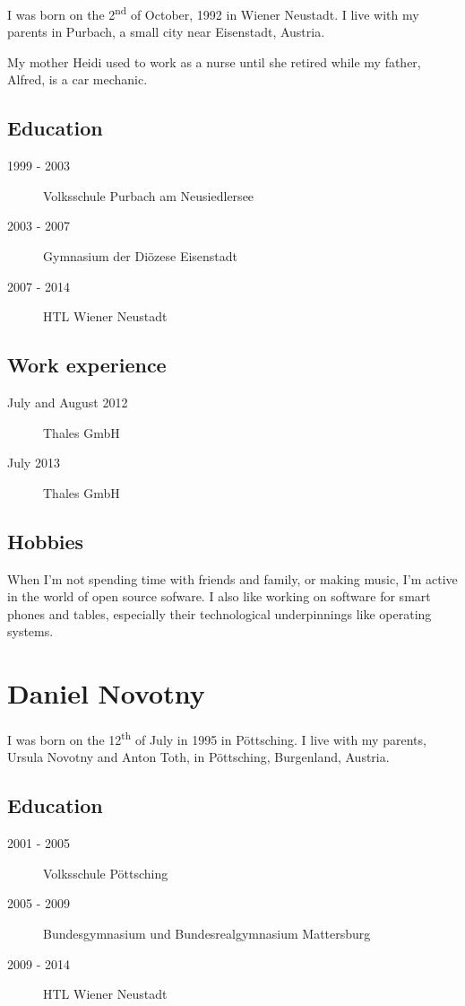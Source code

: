 I was born on the 2\textsuperscript{nd} of October, 1992 in Wiener Neustadt. I live with my parents in Purbach, a small city near Eisenstadt, Austria.

My mother Heidi used to work as a nurse until she retired while my father, Alfred, is a car mechanic.

\subsection{Education}
\begin{description}
\item[1999 - 2003] Volksschule Purbach am Neusiedlersee
\item[2003 - 2007] Gymnasium der Diözese Eisenstadt
\item[2007 - 2014] HTL Wiener Neustadt
\end{description}

\subsection{Work experience}
\begin{description}
	\item[July and August 2012] Thales GmbH
	\item[July 2013] Thales GmbH
\end{description}
\subsection{Hobbies}
When I'm not spending time with friends and family, or making music, I'm active in the world of open source sofware. I also like working on software for smart phones and tables, especially their technological underpinnings like operating systems.

\pagebreak

\section{Daniel Novotny}
I was born on the 12\textsuperscript{th} of July in 1995 in Pöttsching. 
I live with my parents, Ursula Novotny and Anton Toth, in Pöttsching, Burgenland, Austria.
\subsection{Education}
\begin{description}
	\item[2001 - 2005] Volksschule Pöttsching
	\item[2005 - 2009] Bundesgymnasium und Bundesrealgymnasium Mattersburg
	\item[2009 - 2014] HTL Wiener Neustadt
\end{description}

